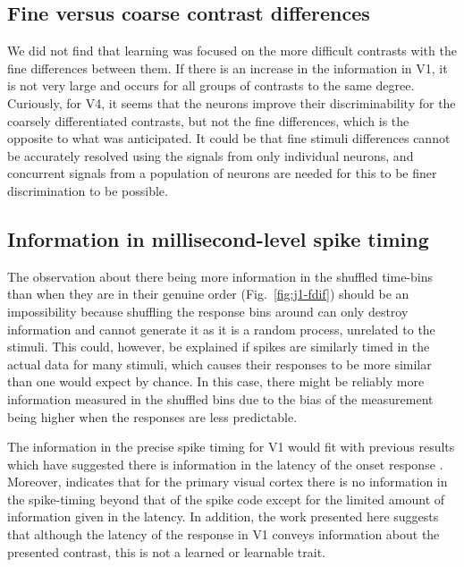 \subsection{Fine versus coarse contrast differences}

We did not find that learning was focused on the more difficult contrasts with the fine differences between them.
If there is an increase in the information in \ac{V1}, it is not very large and occurs for all groups of contrasts to the same degree.
Curiously, for \ac{V4}, it seems that the neurons improve their discriminability for the coarsely differentiated contrasts, but not the fine differences, which is the opposite to what was anticipated.
It could be that fine stimuli differences cannot be accurately resolved using the signals from only individual neurons, and concurrent signals from a population of neurons are needed for this to be finer discrimination to be possible.

\subsection{Information in millisecond-level spike timing}

The observation about there being more information in the shuffled time-bins than when they are in their genuine order (Fig.~\ref{fig:j1-fdif}) should be an impossibility because shuffling the response bins around can only destroy information and cannot generate it as it is a random process, unrelated to the stimuli.
This could, however, be explained if spikes are similarly timed in the actual data for many stimuli, which causes their responses to be more similar than one would expect by chance.
In this case, there might be reliably more information measured in the shuffled bins due to the bias of the measurement being higher when the responses are less predictable.

The information in the precise spike timing for \ac{V1} would fit with previous results which have suggested there is information in the latency of the onset response
\citep{Reich2001,Tovee1993,Rolls2011}.
Moreover, \citep{Tovee1993,Rolls2011} indicates that for the primary visual cortex there is no information in the spike-timing beyond that of the spike code except for the limited amount of information given in the latency.
In addition, the work presented here suggests that although the latency of the response in \ac{V1} conveys information about the presented contrast, this is not a learned or learnable trait.


